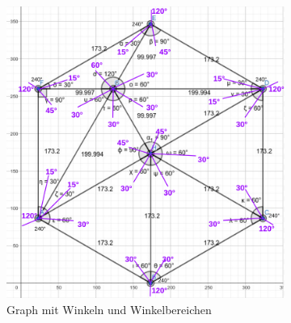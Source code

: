 \begin{figure}[H]
\begin{subfigure}{0.62\textwidth}
\includegraphics[width=0.95\linewidth]{assets/informatik-prototyp/graph-angles.png} 
\caption{Graph mit Winkeln und Winkelbereichen}
\label{fig:angled-graph}
\end{subfigure}
\begin{subfigure}{0.38\textwidth}

\end{subfigure}
\end{figure}
